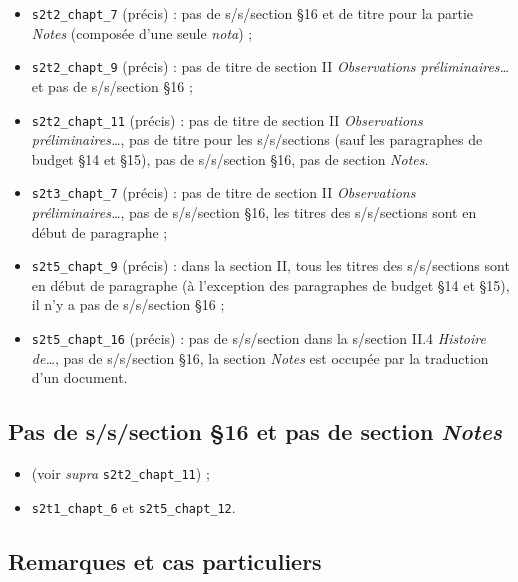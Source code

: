\begin{itemize}
\item
  \texttt{s2t2\_chapt\_7} (précis) : pas de s/s/section §16 et de titre pour la
  partie \textit{Notes} (composée d'une seule \emph{nota}) ;
\item
  \texttt{s2t2\_chapt\_9} (précis) : pas de titre de section II\textit{ Observations
  préliminaires\ldots{}} et pas de s/s/section §16 ;
\item
  \texttt{s2t2\_chapt\_11} (précis) : pas de titre de section II \textit{Observations
  préliminaires\ldots{}}, pas de titre pour les s/s/sections (sauf les
  paragraphes de budget §14 et §15), pas de s/s/section §16, pas de
  section \textit{Notes}.
\item
  \texttt{s2t3\_chapt\_7} (précis) : pas de titre de section II \textit{Observations
  préliminaires\ldots{}}, pas de s/s/section §16, les titres des
  s/s/sections sont en début de paragraphe ;
\item
  \texttt{s2t5\_chapt\_9} (précis) : dans la section II, tous les titres des
  s/s/sections sont en début de paragraphe (à l'exception des
  paragraphes de budget §14 et §15), il n'y a pas de s/s/section §16 ;
\item
  \texttt{s2t5\_chapt\_16} (précis) : pas de s/s/section dans la s/section II.4
  \textit{Histoire de\ldots{}}, pas de s/s/section §16, la section \textit{Notes} est
  occupée par la traduction d'un document.
\end{itemize}

\subsection{Pas de s/s/section §16 et pas de section
\textit{Notes}}\label{ann:no-notes-no-16}

\begin{itemize}
\item
  (voir \emph{supra} \texttt{s2t2\_chapt\_11}) ;
\item
  \texttt{s2t1\_chapt\_6} et \texttt{s2t5\_chapt\_12}.
\end{itemize}

\subsection{Remarques et cas
particuliers}\label{ann:remarques-et-cas-particuliers}

